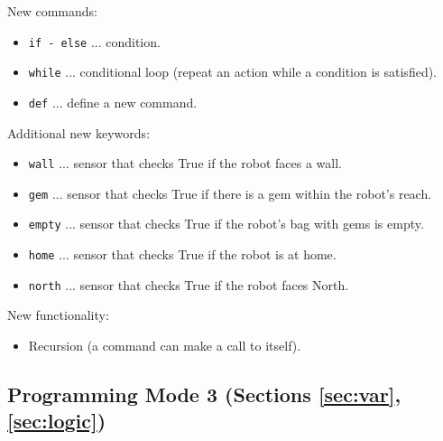 New commands:
\begin{itemize}
\item {\tt if - else} ... condition.
\item {\tt while} ... conditional loop (repeat an action while a condition is satisfied).
\item {\tt def} ... define a new command.
\end{itemize}
Additional new keywords:
\begin{itemize}
\item {\tt wall} ... sensor that checks True if the robot faces a wall.
\item {\tt gem} ... sensor that checks True if there is a gem within the robot's reach.
\item {\tt empty} ... sensor that checks True if the robot's bag with gems is empty.
\item {\tt home} ... sensor that checks True if the robot is at home.
\item {\tt north} ... sensor that checks True if the robot faces North.
\end{itemize}
New functionality:
\begin{itemize}
\item Recursion (a command can make a call to itself).
\end{itemize}

\subsection[\ \ Programming Mode 3 (Sections \ref{sec:var}, \ref{sec:logic})]{Programming Mode 3 (Sections \ref{sec:var}, \ref{sec:logic})}


